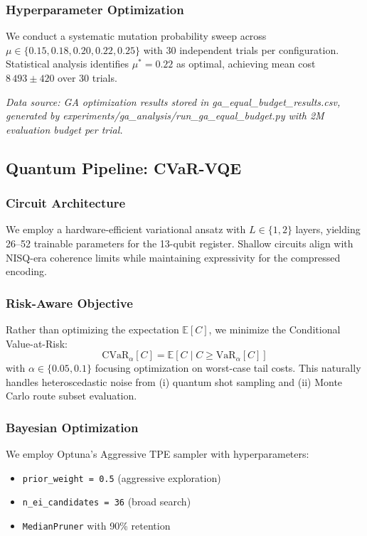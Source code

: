 \subsubsection{Hyperparameter Optimization}
We conduct a systematic mutation probability sweep across $\mu \in \{0.15, 0.18, 0.20, 0.22, 0.25\}$ with 30 independent trials per configuration.
Statistical analysis identifies $\mu^* = 0.22$ as optimal, achieving mean cost $8\,493 \pm 420$ over 30 trials.

\textit{Data source: GA optimization results stored in ga\_equal\_budget\_results.csv, generated by experiments/ga\_analysis/run\_ga\_equal\_budget.py with 2M evaluation budget per trial.}

\subsection{Quantum Pipeline: CVaR-VQE}

\subsubsection{Circuit Architecture}
We employ a hardware-efficient variational ansatz with $L \in \{1, 2\}$ layers, yielding 26--52 trainable parameters for the 13-qubit register.
Shallow circuits align with NISQ-era coherence limits while maintaining expressivity for the compressed encoding.

\subsubsection{Risk-Aware Objective}
Rather than optimizing the expectation $\mathbb{E}[C]$, we minimize the Conditional Value-at-Risk:
\[
\text{CVaR}_\alpha[C] = \mathbb{E}[C \mid C \geq \text{VaR}_\alpha[C]]
\]
with $\alpha \in \{0.05, 0.1\}$ focusing optimization on worst-case tail costs.
This naturally handles heteroscedastic noise from (i) quantum shot sampling and (ii) Monte Carlo route subset evaluation.

\subsubsection{Bayesian Optimization}
We employ Optuna's Aggressive TPE sampler with hyperparameters:
\begin{itemize}
    \item \texttt{prior_weight = 0.5} (aggressive exploration)
    \item \texttt{n_ei_candidates = 36} (broad search)
    \item \texttt{MedianPruner} with 90\% retention
\end{itemize}

